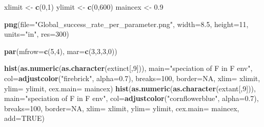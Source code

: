 \documentclass[]{book}
\newenvironment{Shaded}{\begin{snugshade}}{\end{snugshade}}
\newcommand{\KeywordTok}[1]{\textcolor[rgb]{0.13,0.29,0.53}{\textbf{{#1}}}}
\newcommand{\DataTypeTok}[1]{\textcolor[rgb]{0.13,0.29,0.53}{{#1}}}
\newcommand{\DecValTok}[1]{\textcolor[rgb]{0.00,0.00,0.81}{{#1}}}
\newcommand{\FloatTok}[1]{\textcolor[rgb]{0.00,0.00,0.81}{{#1}}}
\newcommand{\StringTok}[1]{\textcolor[rgb]{0.31,0.60,0.02}{{#1}}}
\newcommand{\OtherTok}[1]{\textcolor[rgb]{0.56,0.35,0.01}{{#1}}}
\newcommand{\NormalTok}[1]{{#1}}
\theoremstyle{definition}
\theoremstyle{definition}
\theoremstyle{remark}
\begin{document}
\begin{Shaded}
\begin{Highlighting}[]
\NormalTok{xlimit <-}\StringTok{ }\KeywordTok{c}\NormalTok{(}\DecValTok{0}\NormalTok{,}\DecValTok{1}\NormalTok{)}
\NormalTok{ylimit <-}\StringTok{ }\KeywordTok{c}\NormalTok{(}\DecValTok{0}\NormalTok{,}\DecValTok{600}\NormalTok{)}
\NormalTok{maincex <-}\StringTok{ }\FloatTok{0.9}

\KeywordTok{png}\NormalTok{(}\DataTypeTok{file=}\StringTok{"Global_success_rate_per_parameter.png"}\NormalTok{, }\DataTypeTok{width=}\FloatTok{8.5}\NormalTok{, }\DataTypeTok{height=}\DecValTok{11}\NormalTok{, }\DataTypeTok{units=}\StringTok{"in"}\NormalTok{, }\DataTypeTok{res=}\DecValTok{300}\NormalTok{)}

\KeywordTok{par}\NormalTok{(}\DataTypeTok{mfrow=}\KeywordTok{c}\NormalTok{(}\DecValTok{5}\NormalTok{,}\DecValTok{4}\NormalTok{), }\DataTypeTok{mar=}\KeywordTok{c}\NormalTok{(}\DecValTok{3}\NormalTok{,}\DecValTok{3}\NormalTok{,}\DecValTok{3}\NormalTok{,}\DecValTok{0}\NormalTok{))}


\KeywordTok{hist}\NormalTok{(}\KeywordTok{as.numeric}\NormalTok{(}\KeywordTok{as.character}\NormalTok{(extinct[,}\DecValTok{9}\NormalTok{])), }\DataTypeTok{main=}\StringTok{"speciation of F in F env"}\NormalTok{, }\DataTypeTok{col=}\KeywordTok{adjustcolor}\NormalTok{(}\StringTok{"firebrick"}\NormalTok{, }\DataTypeTok{alpha=}\FloatTok{0.7}\NormalTok{), }\DataTypeTok{breaks=}\DecValTok{100}\NormalTok{, }\DataTypeTok{border=}\OtherTok{NA}\NormalTok{, }\DataTypeTok{xlim=}\NormalTok{ xlimit, }\DataTypeTok{ylim=}\NormalTok{ ylimit, }\DataTypeTok{cex.main=}\NormalTok{ maincex)}
\KeywordTok{hist}\NormalTok{(}\KeywordTok{as.numeric}\NormalTok{(}\KeywordTok{as.character}\NormalTok{(extant[,}\DecValTok{9}\NormalTok{])), }\DataTypeTok{main=}\StringTok{"speciation of F in F env"}\NormalTok{, }\DataTypeTok{col=}\KeywordTok{adjustcolor}\NormalTok{(}\StringTok{"cornflowerblue"}\NormalTok{, }\DataTypeTok{alpha=}\FloatTok{0.7}\NormalTok{), }\DataTypeTok{breaks=}\DecValTok{100}\NormalTok{, }\DataTypeTok{border=}\OtherTok{NA}\NormalTok{, }\DataTypeTok{xlim=}\NormalTok{ xlimit, }\DataTypeTok{ylim=}\NormalTok{ ylimit, }\DataTypeTok{cex.main=}\NormalTok{ maincex, }\DataTypeTok{add=}\OtherTok{TRUE}\NormalTok{)}



\end{Highlighting}
\end{Shaded}
\end{document}
